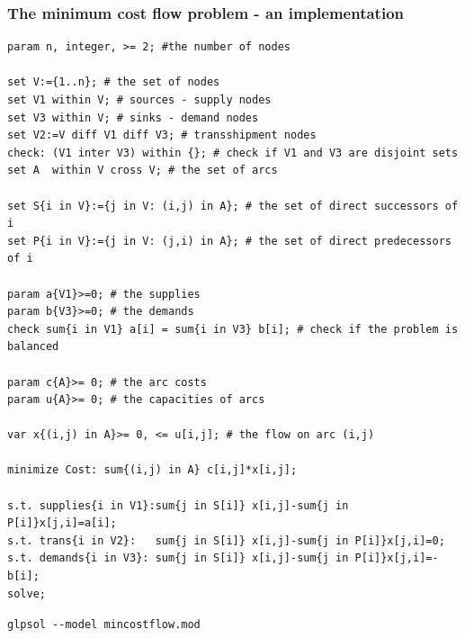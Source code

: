 \documentclass[landscape]{beamer}
\begin{document}
\begin{frame}[fragile]
  \frametitle{The minimum cost flow problem - an implementation}   
\begin{tiny}
\begin{verbatim}
param n, integer, >= 2; #the number of nodes 

set V:={1..n}; # the set of nodes 
set V1 within V; # sources - supply nodes
set V3 within V; # sinks - demand nodes
set V2:=V diff V1 diff V3; # transshipment nodes
check: (V1 inter V3) within {}; # check if V1 and V3 are disjoint sets
set A  within V cross V; # the set of arcs 

set S{i in V}:={j in V: (i,j) in A}; # the set of direct successors of i
set P{i in V}:={j in V: (j,i) in A}; # the set of direct predecessors of i

param a{V1}>=0; # the supplies 
param b{V3}>=0; # the demands 
check sum{i in V1} a[i] = sum{i in V3} b[i]; # check if the problem is balanced

param c{A}>= 0; # the arc costs 
param u{A}>= 0; # the capacities of arcs

var x{(i,j) in A}>= 0, <= u[i,j]; # the flow on arc (i,j)

minimize Cost: sum{(i,j) in A} c[i,j]*x[i,j];

s.t. supplies{i in V1}:sum{j in S[i]} x[i,j]-sum{j in P[i]}x[j,i]=a[i];
s.t. trans{i in V2}:   sum{j in S[i]} x[i,j]-sum{j in P[i]}x[j,i]=0;
s.t. demands{i in V3}: sum{j in S[i]} x[i,j]-sum{j in P[i]}x[j,i]=-b[i];
solve;
\end{verbatim}
\end{tiny}
\begin{small}
\verb=glpsol --model mincostflow.mod=
\end{small}
\end{frame}
\end{document}
